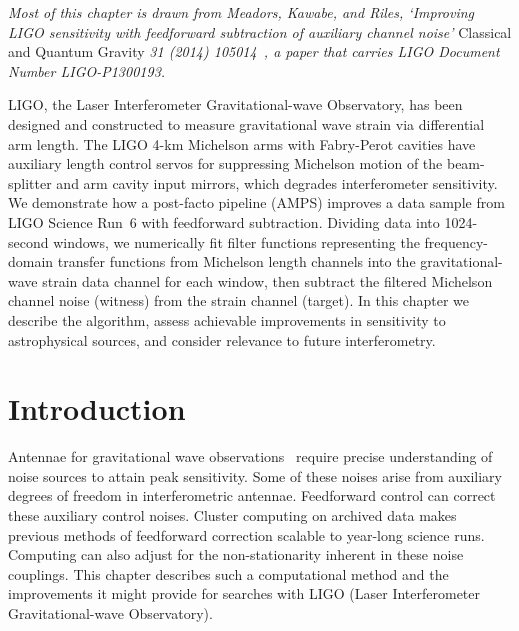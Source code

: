 \textit{Most of this chapter is drawn from Meadors, Kawabe, and Riles, `Improving LIGO sensitivity with feedforward subtraction of auxiliary channel noise'} Classical and Quantum Gravity \textit{31 (2014) 105014~\cite{MeadorsFeedforward2014}, a paper that carries LIGO Document Number LIGO-P1300193. }

LIGO, the Laser Interferometer Gravitational-wave Observatory, has been designed and constructed to measure gravitational wave strain via differential arm length. The LIGO 4-km Michelson arms with Fabry-Perot cavities have auxiliary length control servos for suppressing Michelson motion of the beam-splitter and arm cavity input mirrors, which degrades interferometer sensitivity. We demonstrate how a post-facto pipeline (AMPS) improves a data sample from LIGO Science Run~6 with feedforward subtraction. Dividing data into 1024-second windows, we numerically fit filter functions representing the frequency-domain transfer functions from Michelson length channels into the gravitational-wave strain data channel for each window, then subtract the filtered Michelson channel noise (witness) from the strain channel (target). In this chapter we describe the algorithm, assess achievable improvements in sensitivity to astrophysical sources, and consider relevance to future interferometry.



    \section{Introduction}
    \label{introduction}

Antennae for gravitational wave observations~\cite{Thorne300} require precise understanding of noise sources to attain peak sensitivity. Some of these noises arise from auxiliary degrees of freedom in interferometric antennae. Feedforward control can correct these auxiliary control noises. Cluster computing on archived data makes previous methods of feedforward correction scalable to year-long science runs. Computing can also adjust for the non-stationarity inherent in these noise couplings. This chapter describes such a computational method and the improvements it might provide for searches with LIGO (Laser Interferometer Gravitational-wave Observatory).

